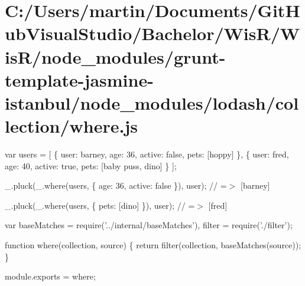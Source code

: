\hypertarget{_c_1_2_users_2martin_2_documents_2_git_hub_visual_studio_2_bachelor_2_wis_r_2_wis_r_2node_moduleee5736b67f8fbe13950fbe49f80772c8}{}\section{C\+:/\+Users/martin/\+Documents/\+Git\+Hub\+Visual\+Studio/\+Bachelor/\+Wis\+R/\+Wis\+R/node\+\_\+modules/grunt-\/template-\/jasmine-\/istanbul/node\+\_\+modules/lodash/collection/where.\+js}
var users = \mbox{[} \{ \textquotesingle{}user\textquotesingle{}\+: \textquotesingle{}barney\textquotesingle{}, \textquotesingle{}age\textquotesingle{}\+: 36, \textquotesingle{}active\textquotesingle{}\+: false, \textquotesingle{}pets\textquotesingle{}\+: \mbox{[}\textquotesingle{}hoppy\textquotesingle{}\mbox{]} \}, \{ \textquotesingle{}user\textquotesingle{}\+: \textquotesingle{}fred\textquotesingle{}, \textquotesingle{}age\textquotesingle{}\+: 40, \textquotesingle{}active\textquotesingle{}\+: true, \textquotesingle{}pets\textquotesingle{}\+: \mbox{[}\textquotesingle{}baby puss\textquotesingle{}, \textquotesingle{}dino\textquotesingle{}\mbox{]} \} \mbox{]};

\+\_\+.\+pluck(\+\_\+.\+where(users, \{ \textquotesingle{}age\textquotesingle{}\+: 36, \textquotesingle{}active\textquotesingle{}\+: false \}), \textquotesingle{}user\textquotesingle{}); // =$>$ \mbox{[}\textquotesingle{}barney\textquotesingle{}\mbox{]}

\+\_\+.\+pluck(\+\_\+.\+where(users, \{ \textquotesingle{}pets\textquotesingle{}\+: \mbox{[}\textquotesingle{}dino\textquotesingle{}\mbox{]} \}), \textquotesingle{}user\textquotesingle{}); // =$>$ \mbox{[}\textquotesingle{}fred\textquotesingle{}\mbox{]}


\begin{DoxyCodeInclude}
var baseMatches = require(\textcolor{stringliteral}{'../internal/baseMatches'}),
    filter = require(\textcolor{stringliteral}{'./filter'});

\textcolor{keyword}{function} where(collection, source) \{
  \textcolor{keywordflow}{return} filter(collection, baseMatches(source));
\}

module.exports = where;
\end{DoxyCodeInclude}
 